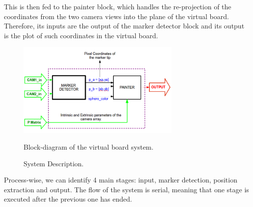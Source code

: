 \documentclass[a4paper,12pt]{article}
\begin{document}
This is then fed to the painter block, which handles the re-projection of the coordinates from the two camera views into the plane of the virtual board. Therefore, its inputs are the output of the marker detector block and its output is the plot of such coordinates in the virtual board.

\begin{figure}[H]
    \begin{center}
	\includegraphics[width=8cm]{architecture}
	\caption{System Description.}
    Block-diagram of the virtual board system.
	\label{fig:descr}
    \end{center}
\end{figure}

Process-wise, we can identify 4 main stages: input, marker detection, position extraction and output. The flow of the system is serial, meaning that one stage is executed after the previous one has ended.
\end{document}
